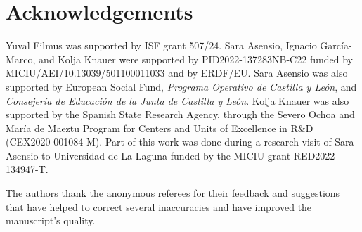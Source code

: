 \documentclass[a4paper,10pt]{amsart}
\begin{document}
\section*{Acknowledgements}

Yuval Filmus was supported by ISF grant 507/24.
Sara Asensio, Ignacio García-Marco, and Kolja Knauer were supported by 
 PID2022-137283NB-C22 funded by MICIU/AEI/10.13039/501100011033 and by ERDF/EU. Sara Asensio was also supported by European Social Fund, \textit{Programa Operativo de Castilla y León}, and \textit{Consejería de Educación de la Junta de Castilla y León}. Kolja Knauer was also supported by the Spanish State Research Agency, through the Severo Ochoa and María de Maeztu Program for Centers and Units of Excellence in R\&D (CEX2020-001084-M). Part of this work was done during a research visit of Sara Asensio to Universidad de La Laguna funded by the MICIU grant RED2022-134947-T.

The authors thank the anonymous referees for their feedback and suggestions that have helped to correct several inaccuracies and have improved the manuscript's quality.

 


    
\end{document}
